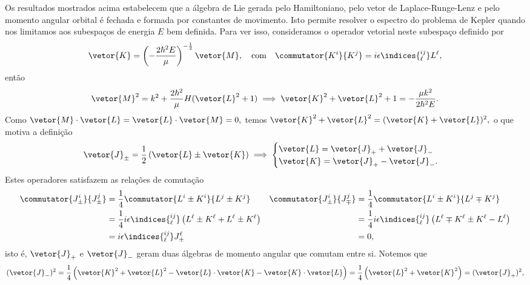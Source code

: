 Os resultados mostrados acima estabelecem que a álgebra de Lie gerada pelo Hamiltoniano, pelo vetor de Laplace-Runge-Lenz e pelo momento angular orbital é fechada e formada por constantes de movimento. Isto permite resolver o espectro do problema de Kepler quando nos limitamos aos subespaços de energia \(E\) bem definida. Para ver isso, consideramos o operador vetorial neste subespaço definido por
\begin{equation*}
   \vetor{K} = \left(-\frac{2 \hbar^2 E}{\mu}\right)^{-\frac12} \vetor{M},\quad\text{com}\quad \commutator{K^i}{K^j}= i \epsilon\indices{^{ij}_\ell} L^\ell,
\end{equation*}
então 
\begin{equation*}
   \vetor{M}^2 = k^2 + \frac{2\hbar^2}{\mu}H(\vetor{L}^2 + 1) \implies \vetor{K}^2 + \vetor{L}^2 + 1 = -\frac{\mu k^2}{2 \hbar^2 E}.
\end{equation*}
Como \(\vetor{M} \cdot \vetor{L} = \vetor{L}\cdot \vetor{M} = 0,\) temos \(\vetor{K}^2 + \vetor{L}^2 = (\vetor{K} + \vetor{L})^2,\) o que motiva a definição
\begin{equation*}
   \vetor{J}_{\pm} = \frac12\left(\vetor{L} \pm \vetor{K}\right) \implies \begin{cases}
      \vetor{L} = \vetor{J}_+ + \vetor{J}_-\\
      \vetor{K} = \vetor{J}_+ - \vetor{J}_-.
   \end{cases}
\end{equation*}
Estes operadores satisfazem as relações de comutação
\begin{align*}
   \commutator{J_\pm^i}{J_\pm^j} &= \frac14 \commutator{L^i \pm K^i}{L^j \pm K^j}&
   \commutator{J_\pm^i}{J_\mp^j} &= \frac14 \commutator{L^i\pm K^i}{L^j \mp K^j}\\
                                 &= \frac14 i \epsilon\indices{^{ij}_\ell} \left(L^\ell \pm K^\ell + L^\ell \pm K^\ell\right)&
                                 &= \frac14 i \epsilon\indices{^{ij}_\ell}\left(L^\ell \mp K^\ell \pm K^\ell - L^\ell\right)\\
                                 &= i \epsilon\indices{^{ij}_\ell} J_{\pm}^\ell&
                                 &= 0,
\end{align*}
isto é, \(\vetor{J}_{+}\) e \(\vetor{J}_{-}\) geram duas álgebras de momento angular que comutam entre si. Notemos que
\begin{equation*}
   (\vetor{J}_-)^2 = \frac{1}{4}\left(\vetor{K}^2 + \vetor{L}^2 - \vetor{L}\cdot\vetor{K} - \vetor{K} \cdot \vetor{L}\right) = \frac14 \left(\vetor{L}^2 + \vetor{K}^2\right) = (\vetor{J}_+)^2,
\end{equation*}
